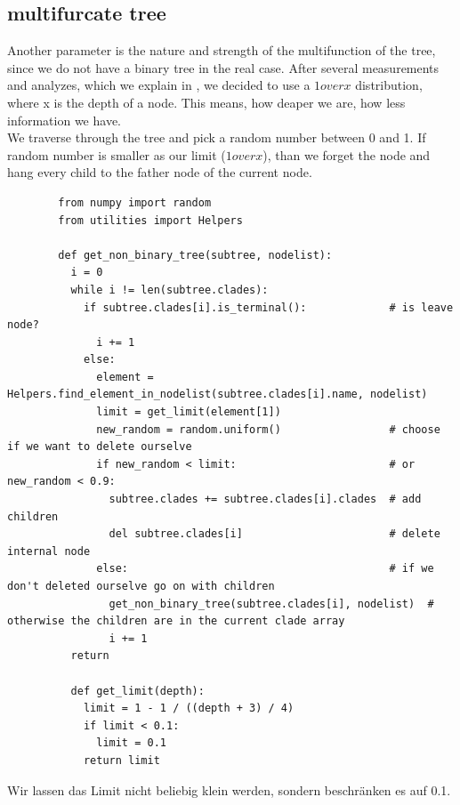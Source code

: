     \subsection{multifurcate tree}
      Another parameter is the nature and strength of the multifunction of the tree, since we do not 
        have a binary tree in the real case. After several measurements and analyzes, which we explain 
        in , we decided to use a $1 over x$ distribution, where x is the depth 
        of a node. This means, how deaper we are, how less information we have. \\
      We traverse through the tree and pick a random number between 0 and 1. If random number is smaller 
        as our limit ($1 over x$), than we forget the node and hang every child to the father node of 
        the current node.
      \begin{lstlisting}
        from numpy import random
        from utilities import Helpers

        def get_non_binary_tree(subtree, nodelist):
          i = 0
          while i != len(subtree.clades):
            if subtree.clades[i].is_terminal():             # is leave node?
              i += 1
            else:
              element = Helpers.find_element_in_nodelist(subtree.clades[i].name, nodelist)
              limit = get_limit(element[1])
              new_random = random.uniform()                 # choose if we want to delete ourselve
              if new_random < limit:                        # or new_random < 0.9:
                subtree.clades += subtree.clades[i].clades  # add children
                del subtree.clades[i]                       # delete internal node
              else:                                         # if we don't deleted ourselve go on with children
                get_non_binary_tree(subtree.clades[i], nodelist)  # otherwise the children are in the current clade array
                i += 1
          return

          def get_limit(depth):
            limit = 1 - 1 / ((depth + 3) / 4)
            if limit < 0.1:
              limit = 0.1
            return limit
      \end{lstlisting}
      Wir lassen das Limit nicht beliebig klein werden, sondern beschränken es auf 0.1.

